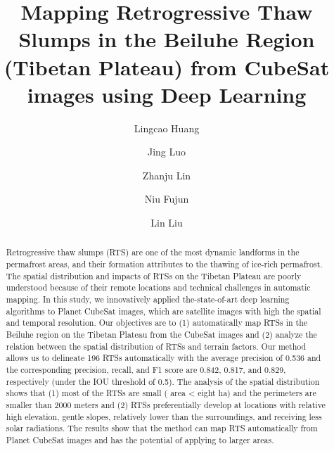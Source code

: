\documentclass[preprint,12pt,authoryear]{elsarticle}
\begin{document}
\begin{frontmatter}




\title{Mapping Retrogressive Thaw Slumps in the Beiluhe Region (Tibetan Plateau) from CubeSat images using Deep Learning}


\author[a]{Lingcao Huang}
\author[b]{Jing Luo}
\author[b]{Zhanju Lin}
\author[b]{Niu Fujun}
\author[a]{Lin Liu}


\address[a]{Earth System Science Programme, Faculty of Science, The Chinese University of Hong Kong, Hong Kong SAR, China.}
\address[b]{Northwest Institute of Eco-Environment and Resources, Chinese Academy of Sciences, LanZhou, China.}

\begin{abstract}

Retrogressive thaw slumps (RTS) are one of the most dynamic landforms in the permafrost areas, and their formation attributes to the thawing of ice-rich permafrost. The spatial distribution and impacts of RTSs on the Tibetan Plateau are poorly understood because of their remote locations and technical challenges in automatic mapping. In this study, we innovatively applied the-state-of-art deep learning algorithms to Planet CubeSat images, which are satellite images with high the spatial and temporal resolution. Our objectives are to (1) automatically map RTSs in the Beiluhe region on the Tibetan Plateau from the CubeSat images and (2) analyze the relation between the spatial distribution of RTSs and terrain factors. Our method allows us to delineate 196 RTSs automatically with the average precision of 0.536 and the corresponding precision, recall, and F1 score are 0.842, 0.817, and 0.829, respectively (under the IOU threshold of 0.5). The analysis of the spatial distribution shows that (1) most of the RTSs are small ( area < eight ha) and the perimeters are smaller than 2000 meters and (2) RTSs preferentially develop at locations with relative high elevation, gentle slopes, relatively lower than the surroundings, and receiving less solar radiations. The results show that the method can map RTS automatically from Planet CubeSat images and has the potential of applying to larger areas.  


\end{abstract}
\end{frontmatter}
\end{document}

